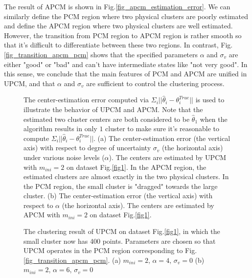 \documentclass[journal]{IEEEtran}
\theoremstyle{definition}
\begin{document}
The result of APCM is shown in Fig.\ref{fig_apcm_estimation_error}.
We can similarly define the PCM region where two physical clusters are poorly estimated and define the APCM region where two physical clusters are well estimated.
However, the transition from PCM region to APCM region is rather smooth so that it's difficult to differentiate between these two regions.
In contrast, Fig.\ref{fig_transition_apcm_pcm} shows that the specified parameters $\alpha$ and $\sigma_v$ are either "good" or "bad" and can't have  
intermediate states like "not very good". In this sense, we conclude that the main features of PCM and APCM are unified in UPCM, and that $\alpha$ and $\sigma_v$ are sufficient to control the clustering process.
\begin{figure}[!t]
   \centering
\caption{The center-estimation error computed via $\Sigma_i||\hat{\theta}_i-\theta_i^{True}||$ is used to illustrate the behavior of UPCM and APCM. Note that the estimated two cluster centers are both considered to be $\hat{\theta}_1$ when the algorithm results in only $1$ cluster to make sure it's reasonable to compute $\Sigma_i||\hat{\theta}_i-\theta_i^{True}||$. (a) The center-estimation error (the vertical axis) with respect to degree of uncertainty $\sigma_v$ (the horizontal axis) under various noise levels ($\alpha$). The centers are estimated by UPCM with $m_{ini}=2$ on dataset Fig.\ref{fig1}. In the APCM region, the estimated clusters are almost exactly in the two physical clusters. In the PCM region, the small cluster is "dragged" towards the large cluster. (b) The center-estimation error (the vertical axis) with respect to $\alpha$ (the horizontal axis). The centers are estimated by APCM with $m_{ini}=2$ on dataset Fig.\ref{fig1}.}
\label{estimation_error_contrast}
\end{figure}
\begin{figure}[!t]
   \centering
\caption{The clustering result of UPCM on dataset Fig.\ref{fig1}, in which the small cluster now has 400 points. Parameters are chosen so that UPCM operates in the PCM region corresponding to Fig.\ref{fig_transition_apcm_pcm}. (a) $m_{ini}=2$, $\alpha=4$, $\sigma_v=0$ (b) $m_{ini}=2$, $\alpha=6$, $\sigma_v=0$}
\label{fig1_merge_case_upcm}
\end{figure}
\end{document}
